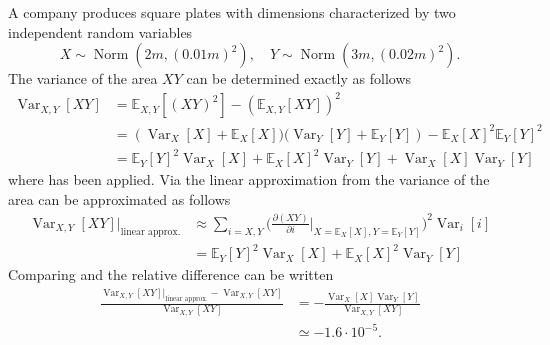 \begin{example}
	A company produces square plates with dimensions characterized by two independent random variables
	\begin{equation}
		X\sim \operatorname{Norm}(2m,(0.01m)^2), \quad Y\sim \operatorname{Norm}(3m,(0.02m)^2).
	\end{equation} 
	The variance of the area $XY$ can be determined exactly as follows
	\begin{equation}
		\label{eq:var1}
		\begin{split}
			\operatorname{Var}_{X,Y}[XY]&=\mathbb{E}_{X,Y}[(XY)^2]-(\mathbb{E}_{X,Y}[XY])^2\\
			&=(\operatorname{Var}_X[X]+\mathbb{E}_X[X]\bigg)\bigg(\operatorname{Var}_Y[Y]+\mathbb{E}_Y[Y])-\mathbb{E}_X[X]^2\mathbb{E}_Y[Y]^2\\
			&=\mathbb{E}_Y[Y]^2\operatorname{Var}_X[X]+\mathbb{E}_X[X]^2\operatorname{Var}_Y[Y]+\operatorname{Var}_X[X]\operatorname{Var}_Y[Y]
		\end{split}
	\end{equation}
	where  has been applied.	Via the linear approximation from  the variance of the area can be approximated as follows
	\begin{equation}
		\label{eq:var2}
		\begin{split}
			\operatorname{Var}_{X,Y}[XY]|_{\text{linear approx.}}&\approx\sum_{i = X,Y} \bigg( \frac{\partial (XY)}{\partial i}\bigg|_{X = \mathbb{E}_X[X],Y = \mathbb{E}_Y[Y]}  \bigg)^2\operatorname{Var}_i[i]\\
			&=\mathbb{E}_Y[Y]^2\operatorname{Var}_X[X]+\mathbb{E}_X[X]^2\operatorname{Var}_Y[Y]
		\end{split}
	\end{equation}
	Comparing  and  the relative difference can be written
	\begin{equation}
		\begin{split}
			\frac{\operatorname{Var}_{X,Y}[XY]|_{\text{linear approx.}}-\operatorname{Var}_{X,Y}[XY]}{\operatorname{Var}_{X,Y}[XY]} &= -\frac{\operatorname{Var}_X[X]\operatorname{Var}_Y[Y]}{\operatorname{Var}_{X,Y}[XY]}\\
			& \simeq -1.6\cdot 10^{-5}.
		\end{split}
	\end{equation}
	
\end{example}

